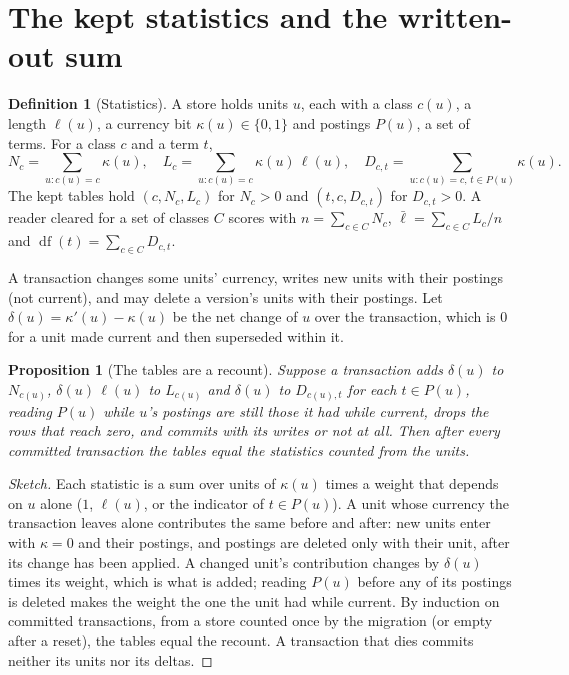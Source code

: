\documentclass[11pt]{article}
\theoremstyle{plain}
\newtheorem{proposition}[theorem]{Proposition}
\theoremstyle{definition}
\newtheorem{definition}[theorem]{Definition}
\theoremstyle{remark}
\newcommand{\df}{\operatorname{df}}
\begin{document}
\section{The kept statistics and the written-out sum}\label{sec:theory}

\begin{definition}[Statistics]
A store holds units $u$, each with a class $c(u)$, a length $\ell(u)$, a currency bit
$\kappa(u) \in \{0, 1\}$ and postings $P(u)$, a set of terms. For a class $c$ and a term $t$,
\[
  N_c = \textstyle\sum_{u : c(u) = c} \kappa(u), \quad
  L_c = \textstyle\sum_{u : c(u) = c} \kappa(u)\,\ell(u), \quad
  D_{c,t} = \textstyle\sum_{u : c(u) = c,\, t \in P(u)} \kappa(u).
\]
The kept tables hold $(c, N_c, L_c)$ for $N_c > 0$ and $(t, c, D_{c,t})$ for $D_{c,t} > 0$. A
reader cleared for a set of classes $C$ scores with $n = \sum_{c \in C} N_c$,
$\bar\ell = \sum_{c \in C} L_c / n$ and $\df(t) = \sum_{c \in C} D_{c,t}$.
\end{definition}

A transaction changes some units' currency, writes new units with their postings (not current), and
may delete a version's units with their postings. Let $\delta(u) = \kappa'(u) - \kappa(u)$ be the
net change of $u$ over the transaction, which is $0$ for a unit made current and then superseded
within it.

\begin{proposition}[The tables are a recount]\label{prop:recount}
Suppose a transaction adds $\delta(u)$ to $N_{c(u)}$, $\delta(u)\,\ell(u)$ to $L_{c(u)}$ and
$\delta(u)$ to $D_{c(u),t}$ for each $t \in P(u)$, reading $P(u)$ while $u$'s postings are still
those it had while current, drops the rows that reach zero, and commits with its writes or not at
all. Then after every committed transaction the tables equal the statistics counted from the
units.
\end{proposition}

\begin{proof}[Sketch]
Each statistic is a sum over units of $\kappa(u)$ times a weight that depends on $u$ alone ($1$,
$\ell(u)$, or the indicator of $t \in P(u)$). A unit whose currency the transaction leaves alone
contributes the same before and after: new units enter with $\kappa = 0$ and their postings, and
postings are deleted only with their unit, after its change has been applied. A changed unit's
contribution changes by $\delta(u)$ times its weight, which is what is added; reading $P(u)$
before any of its postings is deleted makes the weight the one the unit had while current. By
induction on committed transactions, from a store counted once by the migration (or empty after a
reset), the tables equal the recount. A transaction that dies commits neither its units nor its
deltas.
\end{proof}
\end{document}
